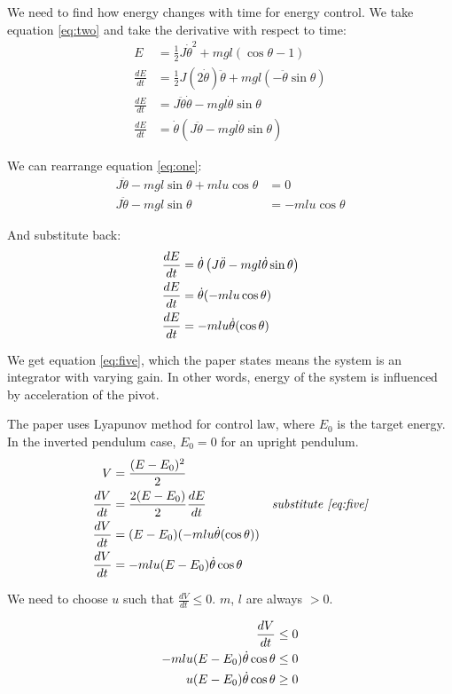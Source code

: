 \documentclass{article}
\begin{document}
We need to find how energy changes with time for energy control. We take equation \eqref{eq:two} and take the derivative with respect to time:
\begin{align*}
    E &= \frac{1}{2}J\dot{\theta}^2 + mgl(\cos{\theta} - 1) \\
    \frac{dE}{dt} &= \frac{1}{2}J(2\dot{\theta})\ddot{\theta} + mgl(-\ddot{\theta}\sin{\theta}) \\
    \frac{dE}{dt} &= J\ddot{\theta}\dot{\theta} - mgl\dot{\theta}\sin{\theta} \\
    \frac{dE}{dt} &= \dot{\theta}\left(J\ddot{\theta} - mgl\dot{\theta}\sin{\theta}\right)
\end{align*}

We can rearrange equation \eqref{eq:one}:
\begin{align*}
    J\ddot{\theta} -mgl\sin{\theta} + mlu\cos{\theta} &= 0 \\
    J\ddot{\theta} -mgl\sin{\theta} &= -mlu\cos{\theta}
\end{align*}

And substitute back:
\begin{align}
    \frac{dE}{dt} &= \dot{\theta}\left(J\ddot{\theta} - mgl\dot{\theta}\sin{\theta}\right) \notag \\
    \frac{dE}{dt} &= \dot{\theta}(-mlu\cos{\theta}) \notag \\
    \frac{dE}{dt} &= -mlu\dot{\theta}(\cos{\theta}) \label{eq:five}
\end{align}

We get equation \eqref{eq:five}, which the paper states means the system is an integrator with varying gain. In other words, energy of the system is influenced by acceleration of the pivot.

The paper uses Lyapunov method for control law, where $E_0$ is the target energy. In the inverted pendulum case, $E_0=0$ for an upright pendulum.
\begin{align*}
    V &= \frac{(E - E_0)^2}{2} \\
    \frac{dV}{dt} &= \frac{2(E-E_0)}{2} \frac{dE}{dt} & \textit{substitute \eqref{eq:five}} \\
    \frac{dV}{dt} &= (E-E_0) (-mlu\dot{\theta}(\cos{\theta})) \\
    \frac{dV}{dt} &= -mlu(E-E_0)\dot{\theta}\cos{\theta}
\end{align*}

We need to choose $u$ such that $\frac{dV}{dt} \leq 0$. $m$, $l$ are always $> 0$.

\begin{align}
    \frac{dV}{dt} & \leq 0 \notag \\
    -mlu(E-E_0)\dot{\theta}\cos{\theta} & \leq 0 \notag \\
    u(E-E_0)\dot{\theta}\cos{\theta} & \geq 0 \notag
\end{align}
\end{document}
